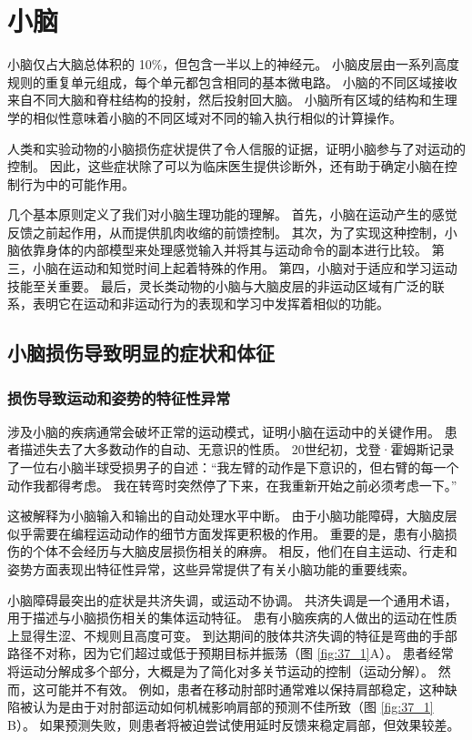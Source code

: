 \chapter{小脑} \label{chap:chap37}

小脑仅占大脑总体积的 10\%，但包含一半以上的神经元。
小脑皮层由一系列高度规则的重复单元组成，每个单元都包含相同的基本微电路。
小脑的不同区域接收来自不同大脑和脊柱结构的投射，然后投射回大脑。
小脑所有区域的结构和生理学的相似性意味着小脑的不同区域对不同的输入执行相似的计算操作。


人类和实验动物的小脑损伤症状提供了令人信服的证据，证明小脑参与了对运动的控制。
因此，这些症状除了可以为临床医生提供诊断外，还有助于确定小脑在控制行为中的可能作用。


几个基本原则定义了我们对小脑生理功能的理解。
首先，小脑在运动产生的感觉反馈之前起作用，从而提供肌肉收缩的前馈控制。
其次，为了实现这种控制，小脑依靠身体的内部模型来处理感觉输入并将其与运动命令的副本进行比较。
第三，小脑在运动和知觉时间上起着特殊的作用。
第四，小脑对于适应和学习运动技能至关重要。
最后，灵长类动物的小脑与大脑皮层的非运动区域有广泛的联系，表明它在运动和非运动行为的表现和学习中发挥着相似的功能。



\section{小脑损伤导致明显的症状和体征}

\subsection{损伤导致运动和姿势的特征性异常}

涉及小脑的疾病通常会破坏正常的运动模式，证明小脑在运动中的关键作用。
患者描述失去了大多数动作的自动、无意识的性质。
20世纪初，戈登·霍姆斯记录了一位右小脑半球受损男子的自述：“我左臂的动作是下意识的，但右臂的每一个动作我都得考虑。
我在转弯时突然停了下来，在我重新开始之前必须考虑一下。”


这被解释为小脑输入和输出的自动处理水平中断。
由于小脑功能障碍，大脑皮层似乎需要在编程运动动作的细节方面发挥更积极的作用。
重要的是，患有小脑损伤的个体不会经历与大脑皮层损伤相关的麻痹。
相反，他们在自主运动、行走和姿势方面表现出特征性异常，这些异常提供了有关小脑功能的重要线索。


小脑障碍最突出的症状是共济失调，或运动不协调。
共济失调是一个通用术语，用于描述与小脑损伤相关的集体运动特征。
患有小脑疾病的人做出的运动在性质上显得生涩、不规则且高度可变。 
到达期间的肢体共济失调的特征是弯曲的手部路径不对称，因为它们超过或低于预期目标并振荡（图 \ref{fig:37_1}A）。
患者经常将运动分解成多个部分，大概是为了简化对多关节运动的控制（运动分解）。
然而，这可能并不有效。
例如，患者在移动肘部时通常难以保持肩部稳定，这种缺陷被认为是由于对肘部运动如何机械影响肩部的预测不佳所致（图 \ref{fig:37_1} B）。
如果预测失败，则患者将被迫尝试使用延时反馈来稳定肩部，但效果较差。


